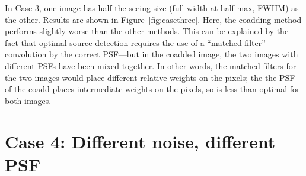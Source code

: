 \documentclass[letter,11pt]{article}
\begin{document}
In Case 3, one image has half the seeing size (full-width at half-max,
FWHM) as the other.  Results are shown in Figure~\ref{fig:casethree}.
Here, the coadding method performs slightly worse than the other
methods.  This can be explained by the fact that optimal source
detection requires the use of a ``matched filter''---convolution by
the correct PSF---but in the coadded image, the two images with
different PSFs have been mixed together.  In other words, the matched
filters for the two images would place different relative weights on
the pixels; the the PSF of the coadd places intermediate weights on
the pixels, so is less than optimal for both images.

\newpage

\section*{Case 4: Different noise, different PSF}
\end{document}
